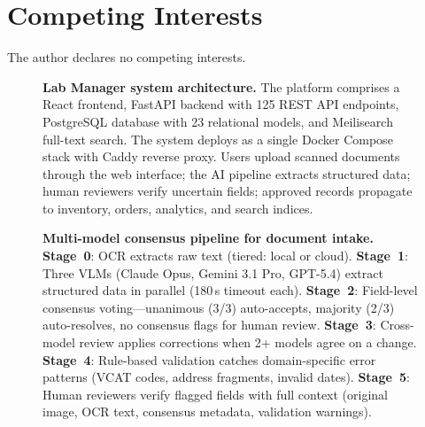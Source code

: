 \documentclass[11pt]{article}
\begin{document}
\section{Competing Interests}
The author declares no competing interests.





\clearpage

\begin{figure}[ht]
  \centering
  \caption{\textbf{Lab Manager system architecture.}
  The platform comprises a React frontend, FastAPI backend with 125 REST
  API endpoints, PostgreSQL database with 23 relational models, and
  Meilisearch full-text search. The system deploys as a single Docker
  Compose stack with Caddy reverse proxy. Users upload scanned documents
  through the web interface; the AI pipeline extracts structured data;
  human reviewers verify uncertain fields; approved records propagate to
  inventory, orders, analytics, and search indices.}
  \label{fig:overview}
\end{figure}

\begin{figure}[ht]
  \centering
  \caption{\textbf{Multi-model consensus pipeline for document intake.}
  \textbf{Stage~0}: OCR extracts raw text (tiered: local or cloud).
  \textbf{Stage~1}: Three VLMs (Claude Opus, Gemini 3.1 Pro, GPT-5.4)
  extract structured data in parallel (180\,s timeout each).
  \textbf{Stage~2}: Field-level consensus voting---unanimous (3/3)
  auto-accepts, majority (2/3) auto-resolves, no consensus flags for
  human review. \textbf{Stage~3}: Cross-model review applies corrections
  when 2+ models agree on a change. \textbf{Stage~4}: Rule-based
  validation catches domain-specific error patterns (VCAT codes, address
  fragments, invalid dates). \textbf{Stage~5}: Human reviewers verify
  flagged fields with full context (original image, OCR text, consensus
  metadata, validation warnings).}
  \label{fig:pipeline}
\end{figure}
\end{document}
